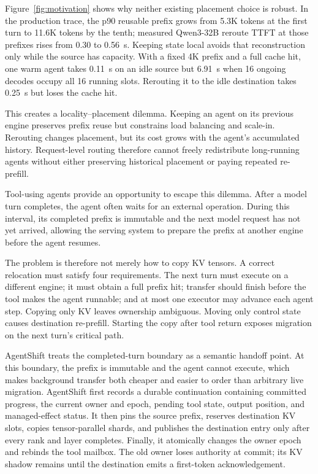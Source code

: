 Figure~\ref{fig:motivation} shows why neither existing placement choice is robust. In the production trace, the p90 reusable prefix grows from 5.3K tokens at the first turn to 11.6K tokens by the tenth; measured Qwen3-32B reroute TTFT at those prefixes rises from 0.30 to 0.56~s. Keeping state local avoids that reconstruction only while the source has capacity. With a fixed 4K prefix and a full cache hit, one warm agent takes 0.11~s on an idle source but 6.91~s when 16 ongoing decodes occupy all 16 running slots. Rerouting it to the idle destination takes 0.25~s but loses the cache hit.

This creates a locality--placement dilemma. Keeping an agent on its previous engine preserves prefix reuse but constrains load balancing and scale-in. Rerouting changes placement, but its cost grows with the agent's accumulated history. Request-level routing therefore cannot freely redistribute long-running agents without either preserving historical placement or paying repeated re-prefill.

Tool-using agents provide an opportunity to escape this dilemma. After a model turn completes, the agent often waits for an external operation. During this interval, its completed prefix is immutable and the next model request has not yet arrived, allowing the serving system to prepare the prefix at another engine before the agent resumes.

The problem is therefore not merely how to copy KV tensors. A correct relocation must satisfy four requirements. The next turn must execute on a different engine; it must obtain a full prefix hit; transfer should finish before the tool makes the agent runnable; and at most one executor may advance each agent step. Copying only KV leaves ownership ambiguous. Moving only control state causes destination re-prefill. Starting the copy after tool return exposes migration on the next turn's critical path.

AgentShift treats the completed-turn boundary as a semantic handoff point. At this boundary, the prefix is immutable and the agent cannot execute, which makes background transfer both cheaper and easier to order than arbitrary live migration. AgentShift first records a durable continuation containing committed progress, the current owner and epoch, pending tool state, output position, and managed-effect status. It then pins the source prefix, reserves destination KV slots, copies tensor-parallel shards, and publishes the destination entry only after every rank and layer completes. Finally, it atomically changes the owner epoch and rebinds the tool mailbox. The old owner loses authority at commit; its KV shadow remains until the destination emits a first-token acknowledgement.


